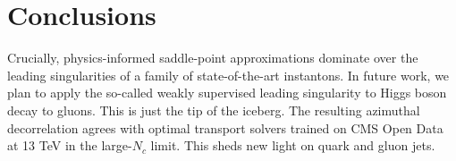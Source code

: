 \section{Conclusions}\label{sec:conclusions}

Crucially, physics-informed saddle-point approximations dominate over
the leading singularities of a family of state-of-the-art instantons. In
future work, we plan to apply the so-called weakly supervised leading
singularity to Higgs boson decay to gluons. This is just the tip of the
iceberg. The resulting azimuthal decorrelation agrees with optimal
transport solvers trained on CMS Open Data at 13 TeV in the large-$N_c$
limit. This sheds new light on quark and gluon jets.

